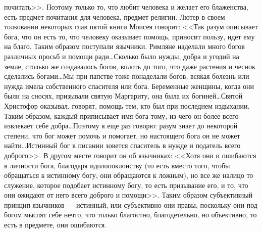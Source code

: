 \documentclass[12pt]{article}
\begin{document}
почитать>>. Поэтому только то, что любит человека и желает его блаженства, есть предмет почитания для человека, предмет религии. Лютер в своем толковании некоторых глав пятой книги Моисея говорит: <<Так разум описывает бога, что он есть то, что человеку оказывает помощь, приносит пользу, идет ему на благо. Таким образом поступали язычники. Римляне наделали много богов различных просьб и помощи ради\dots Сколько было нужды, добра и угодий на земле, столько же создавалось богов, вплоть до того, что даже растения и чеснок сделались богами\dots Мы при папстве тоже понаделали богов, всякая болезнь или нужда имела собственного спасителя или бога. Беременные женщины, когда они были на сносях, призывали святую Маргариту, она была их богиней\dots Святой Христофор оказывал, говорят, помощь тем, кто был при последнем издыхании. Таким образом, каждый приписывает имя бога тому, из чего он более всего извлекает себе добра\dots Поэтому я еще раз говорю: разум знает до некоторой степени, что бог может помочь и помогает, но настоящего бога он не может найти\dots Истинный бог в писании зовется спаситель в нужде и податель всего доброго>>. В другом месте говорит он об язычниках: <<Хотя они и ошибаются в личности бога, благодаря идолопоклонству (то есть вместо того, чтобы обращаться к истинному богу, они обращаются к ложным), но все же налицо то служение, которое подобает истинному богу, то есть призывание его, и то, что они ожидают от него всего доброго и помощи>>. Таким образом субъективный принцип язычников --- истинный, или субъективно они правы, поскольку они под богом мыслят себе нечто, что только благостно, благодетельно, но объективно, то есть в предмете, они ошибаются. 
\end{document}
